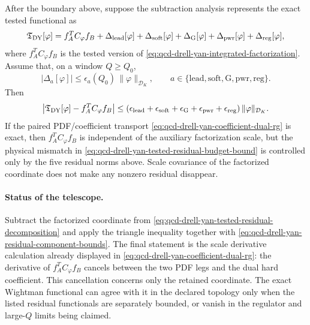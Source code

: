 \begin{remark}
\label{rem:qcd-drell-yan-tested-factorization-proof-obligation-map}
After the boundary above, suppose the subtraction analysis represents the
exact tested functional as
\begin{equation}
  \mathfrak T_{\rm DY}[\varphi]
  =
  f_A^T C_\varphi f_B
  +
  \Delta_{\rm lead}[\varphi]
  +
  \Delta_{\rm soft}[\varphi]
  +
  \Delta_{\rm G}[\varphi]
  +
  \Delta_{\rm pwr}[\varphi]
  +
  \Delta_{\rm reg}[\varphi],
  \label{eq:qcd-drell-yan-tested-residual-decomposition}
\end{equation}
where \(f_A^TC_\varphi f_B\) is the tested version of
\eqref{eq:qcd-drell-yan-integrated-factorization}.  Assume that, on a window
\(Q\ge Q_0\),
\begin{equation}
  |\Delta_a[\varphi]|
  \leq
  \epsilon_a(Q_0)\,\|\varphi\|_{\mathcal D_K},
  \qquad
  a\in\{\mathrm{lead},\mathrm{soft},\mathrm G,\mathrm{pwr},\mathrm{reg}\}.
  \label{eq:qcd-drell-yan-residual-component-bounds}
\end{equation}
Then
\begin{equation}
  \left|
  \mathfrak T_{\rm DY}[\varphi]-f_A^TC_\varphi f_B
  \right|
  \leq
  \left(
  \epsilon_{\rm lead}
  +\epsilon_{\rm soft}
  +\epsilon_{\rm G}
  +\epsilon_{\rm pwr}
  +\epsilon_{\rm reg}
  \right)
  \|\varphi\|_{\mathcal D_K}.
  \label{eq:qcd-drell-yan-tested-residual-budget-bound}
\end{equation}
If the paired PDF/coefficient transport
\eqref{eq:qcd-drell-yan-coefficient-dual-rg} is exact, then
\(f_A^TC_\varphi f_B\) is independent of the auxiliary factorization scale, but
the physical mismatch in
\eqref{eq:qcd-drell-yan-tested-residual-budget-bound} is controlled only by the
five residual norms above.  Scale covariance of the factorized coordinate does
not make any nonzero residual disappear.
\paragraph{Status of the telescope.}

Subtract the factorized coordinate from
\eqref{eq:qcd-drell-yan-tested-residual-decomposition} and apply the triangle
inequality together with
\eqref{eq:qcd-drell-yan-residual-component-bounds}.  The final statement is the
scale derivative calculation already displayed in
\eqref{eq:qcd-drell-yan-coefficient-dual-rg}: the derivative of
\(f_A^TC_\varphi f_B\) cancels between the two PDF legs and the dual hard
coefficient.  This cancellation concerns only the retained coordinate.  The
exact Wightman functional can agree with it in the declared topology only when
the listed residual functionals are separately bounded, or vanish in the
regulator and large-\(Q\) limits being claimed.
\end{remark}

